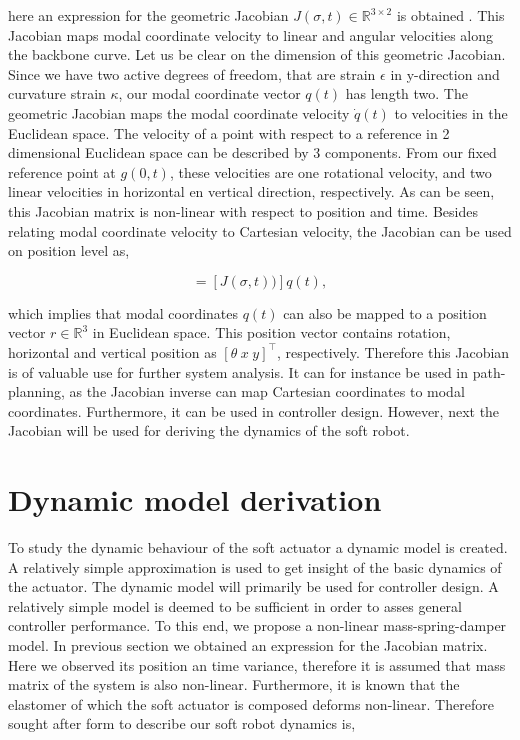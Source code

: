 here an expression for the geometric Jacobian $J(\sigma,t) \in \mathbb{R}^{3\times 2}$ is obtained \cite{Caasenbrood2020}. This Jacobian maps modal coordinate velocity to linear and angular velocities along the backbone curve. Let us be clear on the dimension of this geometric Jacobian. 
Since we have two active degrees of freedom, that are strain $\epsilon$ in y-direction and curvature strain $\kappa$, our modal coordinate vector $q(t)$ has length two. The geometric Jacobian maps the modal coordinate velocity $\dot{q}(t)$ to velocities in the Euclidean space. The velocity of a point with respect to a reference in 2 dimensional Euclidean space can be described by 3 components. From our fixed reference point at $g(0,t)$, these velocities are one rotational velocity, and two linear velocities in horizontal en vertical direction, respectively. As can be seen, this Jacobian matrix is non-linear with respect to position and time. Besides relating modal coordinate velocity to Cartesian velocity, the Jacobian can be used on position level as,

\begin{equation}
    [r(\sigma,t)] = [J(\sigma,t))]q(t),
\end{equation}

which implies that modal coordinates $q(t)$ can also be mapped to a position vector $r\in \mathbb{R}^3$ in Euclidean space. This position vector contains rotation, horizontal and vertical position as $[\theta \hspace{3pt} x \hspace{3pt} y]^\top$, respectively. Therefore this Jacobian is of valuable use for further system analysis. It can for instance be used in path-planning, as the Jacobian inverse can map Cartesian coordinates to modal coordinates. Furthermore, it can be used in controller design. However, next the Jacobian will be used for deriving the dynamics of the soft robot. 


\section{Dynamic model derivation}


To study the dynamic behaviour of the soft actuator a dynamic model is created. A relatively simple approximation is used to get insight of the basic dynamics of the actuator. The dynamic model will primarily be used for controller design. A relatively simple model is deemed to be sufficient in order to asses general controller performance. To this end, we propose a non-linear mass-spring-damper model. In previous section we obtained an expression for the Jacobian matrix. Here we observed its position an time variance, therefore it is assumed that mass matrix of the system is also non-linear. Furthermore, it is known that the elastomer of which the soft actuator is composed deforms non-linear. Therefore sought after form to describe our soft robot dynamics is,



